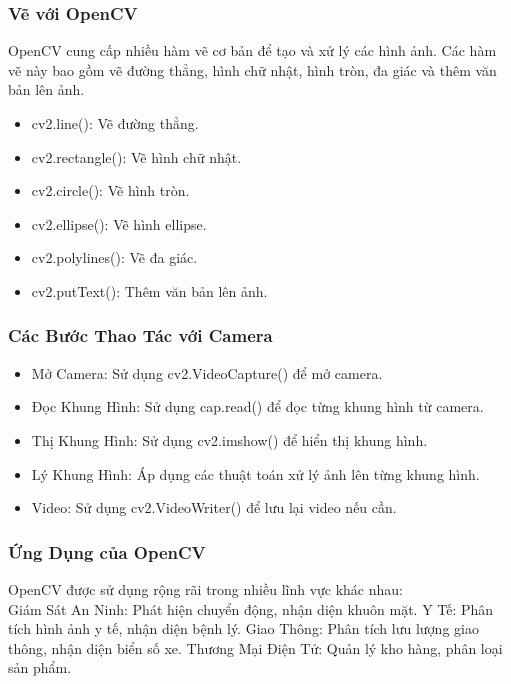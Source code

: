 \begin{flushleft}
    \subsubsection{Vẽ với OpenCV}
    OpenCV cung cấp nhiều hàm vẽ cơ bản để tạo và xử lý các hình ảnh. Các hàm vẽ này bao gồm vẽ đường thẳng, hình chữ nhật, hình tròn, đa giác và thêm văn bản lên ảnh.\\
    \begin{itemize}
        \item cv2.line(): Vẽ đường thẳng.
        \item cv2.rectangle(): Vẽ hình chữ nhật.
        \item cv2.circle(): Vẽ hình tròn.
        \item cv2.ellipse(): Vẽ hình ellipse.
        \item cv2.polylines(): Vẽ đa giác.
        \item cv2.putText(): Thêm văn bản lên ảnh.
    \end{itemize}
    \subsubsection{Các Bước Thao Tác với Camera}
    \begin{itemize}
        \item Mở Camera: Sử dụng cv2.VideoCapture() để mở camera.
        \item Đọc Khung Hình: Sử dụng cap.read() để đọc từng khung hình từ camera.
        \item Thị Khung Hình: Sử dụng cv2.imshow() để hiển thị khung hình.
        \item Lý Khung Hình: Áp dụng các thuật toán xử lý ảnh lên từng khung hình.
        \item Video: Sử dụng cv2.VideoWriter() để lưu lại video nếu cần.
    \end{itemize}
    \subsubsection{Ứng Dụng của OpenCV}
    OpenCV được sử dụng rộng rãi trong nhiều lĩnh vực khác nhau: \\
    Giám Sát An Ninh: Phát hiện chuyển động, nhận diện khuôn mặt.
    Y Tế: Phân tích hình ảnh y tế, nhận diện bệnh lý.
    Giao Thông: Phân tích lưu lượng giao thông, nhận diện biển số xe.
    Thương Mại Điện Tử: Quản lý kho hàng, phân loại sản phẩm.


\end{flushleft}
